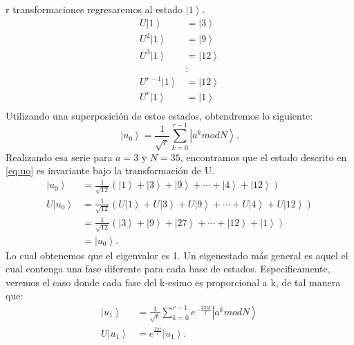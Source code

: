 r transformaciones regresaremos al estado $\left|1\right\rangle$.
\begin{align*}
    U\left| 1 \right\rangle &= \left|3\right\rangle \\
    U^2\left| 1 \right\rangle &= \left|9\right\rangle \\
    U^3\left| 1 \right\rangle &= \left|12\right\rangle \\ 
                    & \vdots  \\ 
    U^{r-1}\left| 1 \right\rangle &= \left|12\right\rangle \\
    U^r\left| 1 \right\rangle &= \left|1\right\rangle \\
\end{align*}
Utilizando una superposición de estos estados, obtendremos lo siguiente:
\begin{equation}
    \left| u_0 \right\rangle = \frac{1}{\sqrt{r}} \sum\limits_{k=0}^{r-1} \left|a^k mod N \right\rangle.
    \label{eq:u0}
\end{equation}
Realizando esa serie para $a=3$ y $N=35$, encontramos que el estado descrito en \ref{eq:uo} es invariante bajo la transformación de U.
\begin{align*}
    \left| u_0 \right\rangle &= \frac{1}{\sqrt{12}} \left(\left|1\right\rangle + \left|3\right\rangle+ \left|9\right\rangle 
    +\cdots +\left|4\right\rangle + \left|12\right\rangle \right)\\
    U\left| u_0 \right\rangle &= \frac{1}{\sqrt{12}} \left(U\left|1\right\rangle + U\left|3\right\rangle+ U\left|9\right\rangle 
    +\cdots +U\left|4\right\rangle + U\left|12\right\rangle \right)\\
    &= \frac{1}{\sqrt{12}} \left(\left|3\right\rangle + \left|9\right\rangle+ \left|27\right\rangle 
    +\cdots +\left|12\right\rangle + \left|1\right\rangle \right)\\
    &= \left| u_0 \right\rangle .
\end{align*}
Lo cual obtenemos que el eigenvalor es 1. Un eigenestado más general es aquel el cual contenga una fase diferente para cada base de estados. Especificamente, veremos el caso
donde cada fase del k-esimo es proporcional a k, de tal manera que:
\begin{align}
    \label{eq:u1}
    \left| u_1 \right\rangle &= \frac{1}{\sqrt{r}} \sum\limits_{k=0}^{r-1} e^{-\frac{2\pi i k}{r}} \left| a^k mod N \right\rangle \\
    \label{eq:ua1}
    U\left| u_1 \right\rangle &= e^{\frac{2\pi i}{r}} \left| u_1 \right\rangle.
\end{align}
